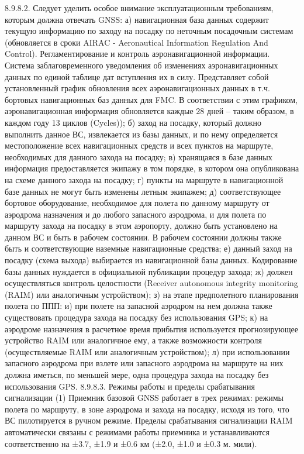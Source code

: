 8.9.8.2. Следует уделить особое внимание эксплуатационным требованиям, которым должна отвечать GNSS:
а)	навигационная база данных содержит текущую информацию по заходу на посадку по неточным посадочным системам (обновляется в сроки AIRAC - Aeronautical Information Regulation And Control). Регламентирование и контроль аэронавигационной информации. Система заблаговременного уведомления об изменениях аэронавигационных данных по единой таблице дат вступления их в силу. Представляет собой установленный график обновления всех аэронавигационных данных в т.ч. бортовых навигационных баз данных для FMC. В соответствии с этим графиком, аэронавигационная информация обновляется каждые 28 дней – таким образом, в каждом году 13 циклов (Cycles));
б)	заход на посадку, который должно выполнить данное ВС, извлекается из базы данных, и по нему определяется местоположение всех навигационных средств и всех пунктов на маршруте, необходимых для данного захода на посадку;
в)	хранящаяся в базе данных информация предоставляется экипажу в том порядке, в котором она опубликована на схеме данного захода на посадку;
г)	пункты на маршруте в навигационной базе данных не могут быть изменены летным экипажем;
д)	соответствующее бортовое оборудование, необходимое для полета по данному маршруту от аэродрома назначения и до любого запасного аэродрома, и для полета по маршруту захода на посадку в этом аэропорту, должно быть установлено на данном ВС и быть в рабочем состоянии. В рабочем состоянии должны также быть и соответствующие наземные навигационные средства;
е)	данный заход на посадку (схема выхода) выбирается из навигационной базы данных. Кодирование базы данных нуждается в официальной публикации процедур захода;
ж)	должен осуществляться контроль целостности (Receiver autonomous integrity monitoring (RAIM) или аналогичным устройством);
з)	на этапе предполетного планирования полета по ППП:
и)	при полете на запасной аэродром на нем должна также существовать процедура захода на посадку без использования GPS;
к)	на аэродроме назначения в расчетное время прибытия используется прогнозирующее устройство RAIM или аналогичное ему, а также возможности контроля (осуществляемые RAIM или аналогичным устройством);
л)	при использовании запасного аэродрома при взлете или запасного аэродрома на маршруте на них должна иметься, по меньшей мере, одна процедура захода на посадку без использования GPS.
8.9.8.3.	Режимы работы и пределы срабатывания сигнализации
(1) Приемник базовой GNSS работает в трех режимах: режимы полета по маршруту, в зоне аэродрома и захода на посадку, исходя из того, что ВС пилотируется в ручном режиме. Пределы срабатывания сигнализации RAIM автоматически связаны с режимами работы приемника и устанавливаются соответственно на ±3.7, ±1.9 и ±0.6 км (±2.0, ±1.0 и ±0.3 м. мили).
